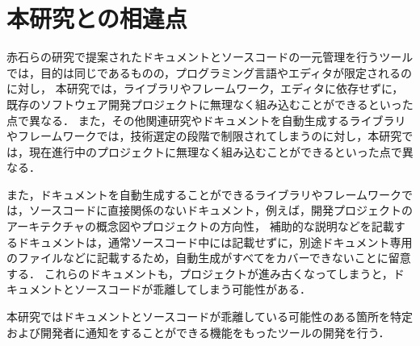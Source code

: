 \section{本研究との相違点}
赤石らの研究で提案されたドキュメントとソースコードの一元管理を行うツールでは，目的は同じであるものの，プログラミング言語やエディタが限定されるのに対し，
本研究では，ライブラリやフレームワーク，エディタに依存せずに，既存のソフトウェア開発プロジェクトに無理なく組み込むことができるといった点で異なる．
また，その他関連研究やドキュメントを自動生成するライブラリやフレームワークでは，技術選定の段階で制限されてしまうのに対し，本研究では，現在進行中のプロジェクトに無理なく組み込むことができるといった点で異なる．

また，ドキュメントを自動生成することができるライブラリやフレームワークでは，ソースコードに直接関係のないドキュメント，例えば，開発プロジェクトのアーキテクチャの概念図やプロジェクトの方向性，
補助的な説明などを記載するドキュメントは，通常ソースコード中には記載せずに，別途ドキュメント専用のファイルなどに記載するため，自動生成がすべてをカバーできないことに留意する．
これらのドキュメントも，プロジェクトが進み古くなってしまうと，ドキュメントとソースコードが乖離してしまう可能性がある．

本研究ではドキュメントとソースコードが乖離している可能性のある箇所を特定および開発者に通知をすることができる機能をもったツールの開発を行う．

